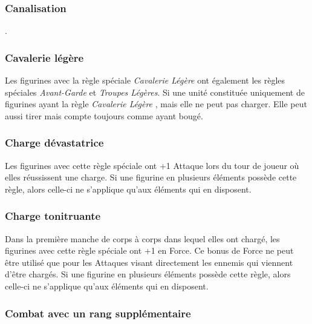 \subsubsection*{Canalisation}

.

\subsubsection*{Cavalerie légère}

Les figurines avec la règle spéciale \emph{Cavalerie Légère} ont également les règles spéciales \emph{Avant-Garde} et \emph{Troupes Légères}. Si une unité constituée uniquement de figurines ayant la règle \emph{Cavalerie Légère} , mais elle ne peut pas charger. Elle peut aussi tirer mais compte toujours comme ayant bougé.

\subsubsection*{Charge dévastatrice}

Les figurines avec cette règle spéciale ont +1 Attaque lors du tour de joueur où elles réussissent une charge. Si une figurine en plusieurs éléments possède cette règle, alors celle-ci ne s'applique qu'aux éléments qui en disposent.

\subsubsection*{Charge tonitruante}

Dans la première manche de corps à corps dans lequel elles ont chargé, les figurines avec cette règle spéciale ont +1 en Force. Ce bonus de Force ne peut être utilisé que pour les Attaques visant directement les ennemis qui viennent d'être chargés. Si une figurine en plusieurs éléments possède cette règle, alors celle-ci ne s'applique qu'aux éléments qui en disposent.

\subsubsection*{Combat avec un rang supplémentaire}

